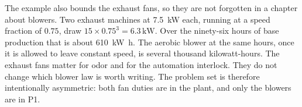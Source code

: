 The example also bounds the exhaust fans, so they are not forgotten in a chapter about blowers. Two exhaust machines at \SI{7.5}{\kilo\watt} each, running at a speed fraction of $0.75$, draw $15\times 0.75^{3}=6.3\,\mathrm{kW}$. Over the ninety-six hours of base production that is about \SI{610}{\kilo\watt\hour}. The aerobic blower at the same hours, once it is allowed to leave constant speed, is several thousand kilowatt-hours. The exhaust fans matter for odor and for the automation interlock. They do not change which blower law is worth writing. The problem set is therefore intentionally asymmetric: both fan duties are in the plant, and only the blowers are in P1.
